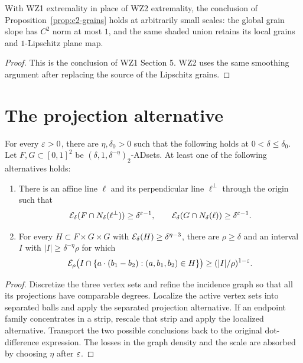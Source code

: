 \begin{proposition}
\label{prop:wz1-c2-grains}
With WZ1 extremality in place of WZ2 extremality, the conclusion of
Proposition~\ref{prop:c2-grains} holds at arbitrarily small scales:
the global grain slope has $C^2$ norm at most $1$, and the same
shaded union retains its local grains and $1$-Lipschitz plane map.
\end{proposition}
\begin{proof}
This is the conclusion of WZ1 Section 5. WZ2 uses the same smoothing
argument after replacing the source of the Lipschitz grains.
\end{proof}

\section{The projection alternative}

\begin{theorem}
\label{thm:wz1-projection}
For every $\varepsilon>0$, there are $\eta,\delta_0>0$ such that the
following holds at $0<\delta\leq\delta_0$. Let
$F,G\subset[0,1]^2$ be $(\delta,1,\delta^{-\eta})_2$-ADsets.
At least one of the following alternatives holds:
\begin{enumerate}
\item There is an affine line $\ell$ and its perpendicular line
$\ell^\perp$ through the origin such that
\[
 \mathcal{E}_\delta(F\cap N_\delta(\ell^\perp))\geq\delta^{\varepsilon-1},
 \qquad
 \mathcal{E}_\delta(G\cap N_\delta(\ell))\geq\delta^{\varepsilon-1}.
\]
\item For every $H\subset F\times G\times G$ with
$\mathcal{E}_\delta(H)\geq\delta^{\eta-3}$, there are $\rho\geq\delta$
and an interval $I$ with $|I|\geq\delta^{-\eta}\rho$ for which
\[
 \mathcal{E}_\rho\bigl(I\cap
       \{a\cdot(b_1-b_2):(a,b_1,b_2)\in H\}\bigr)
                  \geq(|I|/\rho)^{1-\varepsilon}.
\]
\end{enumerate}
\end{theorem}
\begin{proof}
Discretize the three vertex sets and refine the incidence graph so
that all its projections have comparable degrees. Localize the active
vertex sets into separated balls and apply the separated projection
alternative. If an endpoint family concentrates in a strip, rescale
that strip and apply the localized alternative. Transport the two
possible conclusions back to the original dot-difference expression.
The losses in the graph density and the scale are absorbed by choosing
$\eta$ after $\varepsilon$.
\end{proof}

